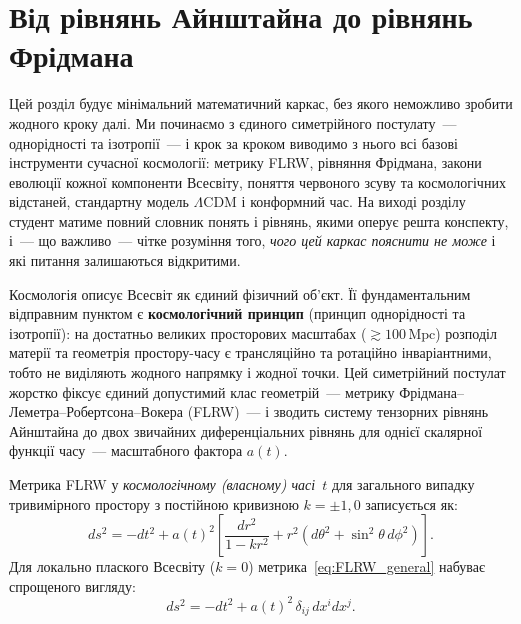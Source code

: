 
\chapter{Від рівнянь Айнштайна до рівнянь Фрідмана}
\label{sec:friedmann}

Цей розділ будує мінімальний математичний каркас, без якого неможливо
зробити жодного кроку далі. Ми починаємо з єдиного симетрійного постулату~---
однорідності та ізотропії~--- і крок за кроком виводимо з нього всі базові
інструменти сучасної космології: метрику FLRW, рівняння Фрідмана, закони
еволюції кожної компоненти Всесвіту, поняття червоного зсуву та космологічних
відстаней, стандартну модель $\Lambda$CDM і конформний час.
На виході розділу студент матиме повний словник понять і рівнянь, якими
оперує решта конспекту, і~--- що важливо~--- чітке розуміння того, \emph{чого
цей каркас пояснити не може} і які питання залишаються відкритими.

Космологія описує Всесвіт як єдиний фізичний об'єкт. Її фундаментальним
відправним пунктом є \textbf{космологічний принцип} (принцип однорідності та ізотропії):
на достатньо великих просторових масштабах ($\gtrsim 100\,\mathrm{Mpc}$) розподіл
матерії та геометрія простору-часу є трансляційно та ротаційно інваріантними, тобто
не виділяють жодного напрямку і жодної точки. Цей симетрійний постулат
жорстко фіксує єдиний допустимий клас геометрій~--- метрику
Фрідмана--Леметра--Робертсона--Вокера (FLRW)~--- і зводить систему тензорних
рівнянь Айнштайна до двох звичайних диференціальних рівнянь для однієї скалярної
функції часу~--- масштабного фактора $a(t)$.

Метрика FLRW у \emph{космологічному (власному) часі}~$t$ для загального випадку
тривимірного простору з постійною кривизною $k = \pm 1, 0$ записується як:
\begin{equation}\label{eq:FLRW_general}
  ds^2 = -dt^2 + a(t)^2 \left[ \frac{dr^2}{1 - kr^2} + r^2(d\theta^2 + \sin^2\theta\,d\phi^2) \right].
\end{equation}
Для локально плаского Всесвіту ($k = 0$) метрика~\eqref{eq:FLRW_general} набуває спрощеного вигляду:
\begin{equation}\label{eq:FLRW}
  ds^2 = -dt^2 + a(t)^2\,\delta_{ij}\,dx^i dx^j.
\end{equation}

